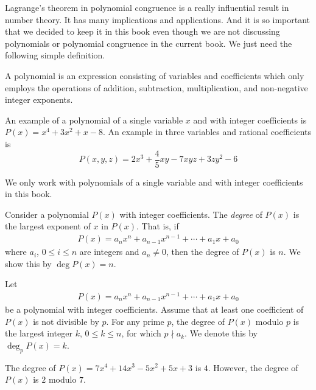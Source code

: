 Lagrange's theorem in polynomial congruence is a really influential result in number theory. It has many implications and applications. And it is so important that we decided to keep it in this book even though we are not discussing polynomials or polynomial congruence in the current book. We just need the following simple definition.

	\begin{definition}
		A polynomial is an expression consisting of variables and coefficients which only employs the operations of addition, subtraction, multiplication, and non-negative integer exponents.
	\end{definition}

	\begin{example}
		An example of a polynomial of a single variable $x$ and with integer coefficients is $P(x)=x^4+3x^2 + x -8$. An example in three variables and rational coefficients is
			$$P(x,y,z)=2x^3 + \dfrac{4}{5}xy- 7xyz + 3zy^2 - 6$$
	\end{example}

	\begin{note}
		We only work with polynomials of a single variable and with integer coefficients in this book.
	\end{note}

	\begin{definition}
		Consider a polynomial $P(x)$ with integer coefficients. The \textit{degree} of $P(x)$ is the largest exponent of $x$ in $P(x)$. That is, if
			\begin{align*}
				P(x)=a_nx^n + a_{n-1}x^{n-1} + \cdots + a_1 x +a_0
			\end{align*}
	 where $a_i$, $0 \leq i \leq n$ are integers and $a_n \neq 0$, then the degree of $P(x)$ is $n$. We show this by $\deg P(x)=n$.
	\end{definition}

	\begin{definition}
		Let
			\begin{align*}
				P(x)=a_nx^n + a_{n-1}x^{n-1} + \cdots + a_1 x +a_0
			\end{align*}
		be a polynomial with integer coefficients. Assume that at least one coefficient of $P(x)$ is not divisible by $p$. For any prime $p$, the degree of $P(x)$ modulo $p$ is the largest integer $k$, $0 \leq k \leq n$,  for which $p \nmid a_k$. We denote this by $\deg_p P(x)=k$.
	\end{definition}

	\begin{example}
		The degree of $P(x)=7x^4 + 14x^3 - 5x^2 + 5x + 3$ is $4$. However, the degree of $P(x)$ is $2$ modulo $7$.
	\end{example}


